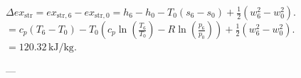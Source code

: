 \( \Delta ex_{\text{str}} = ex_{\text{str},6} - ex_{\text{str},0} = h_6 - h_0 - T_0 (s_6 - s_0) + \frac{1}{2} (w_6^2 - w_0^2) \).  
\( = c_p (T_6 - T_0) - T_0 \left( c_p \ln \left( \frac{T_6}{T_0} \right) - R \ln \left( \frac{p_6}{p_0} \right) \right) + \frac{1}{2} (w_6^2 - w_0^2) \).  
\( = 120.32 \, \text{kJ/kg} \).  

---